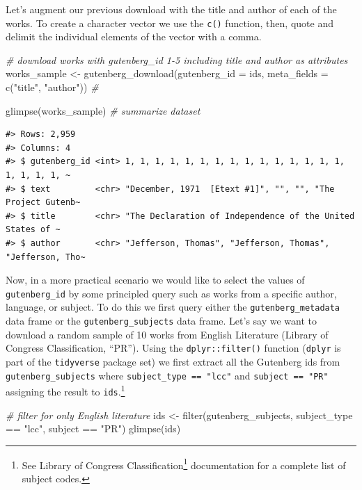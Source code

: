 \documentclass[
  letterpaper,
]{scrbook}
\newenvironment{Shaded}{\begin{snugshade}}{\end{snugshade}}
\newcommand{\AttributeTok}[1]{\textcolor[rgb]{0.00,0.00,0.00}{#1}}
\newcommand{\CommentTok}[1]{\textcolor[rgb]{0.00,0.00,0.00}{\textit{#1}}}
\newcommand{\FunctionTok}[1]{\textcolor[rgb]{0.00,0.00,0.00}{#1}}
\newcommand{\NormalTok}[1]{\textcolor[rgb]{0.00,0.00,0.00}{#1}}
\newcommand{\OtherTok}[1]{\textcolor[rgb]{0.00,0.00,0.00}{#1}}
\newcommand{\SpecialCharTok}[1]{\textcolor[rgb]{0.00,0.00,0.00}{#1}}
\newcommand{\StringTok}[1]{\textcolor[rgb]{0.00,0.00,0.00}{#1}}
\DeclareRobustCommand{\href}[2]{#2\footnote{\url{#1}}}
\begin{document}
Let's augment our previous download with the title and author of each of
the works. To create a character vector we use the \texttt{c()}
function, then, quote and delimit the individual elements of the vector
with a comma.

\begin{Shaded}
\begin{Highlighting}[]
\CommentTok{\# download works with \textasciigrave{}gutenberg\_id\textasciigrave{} 1{-}5 including \textasciigrave{}title\textasciigrave{} and \textasciigrave{}author\textasciigrave{} as attributes}
\NormalTok{works\_sample }\OtherTok{\textless{}{-}} 
  \FunctionTok{gutenberg\_download}\NormalTok{(}\AttributeTok{gutenberg\_id =}\NormalTok{ ids, }\AttributeTok{meta\_fields =} \FunctionTok{c}\NormalTok{(}\StringTok{"title"}\NormalTok{, }\StringTok{"author"}\NormalTok{)) }\CommentTok{\#}

\FunctionTok{glimpse}\NormalTok{(works\_sample) }\CommentTok{\# summarize dataset}
\end{Highlighting}
\end{Shaded}

\begin{verbatim}
#> Rows: 2,959
#> Columns: 4
#> $ gutenberg_id <int> 1, 1, 1, 1, 1, 1, 1, 1, 1, 1, 1, 1, 1, 1, 1, 1, 1, 1, 1, ~
#> $ text         <chr> "December, 1971  [Etext #1]", "", "", "The Project Gutenb~
#> $ title        <chr> "The Declaration of Independence of the United States of ~
#> $ author       <chr> "Jefferson, Thomas", "Jefferson, Thomas", "Jefferson, Tho~
\end{verbatim}

Now, in a more practical scenario we would like to select the values of
\texttt{gutenberg\_id} by some principled query such as works from a
specific author, language, or subject. To do this we first query either
the \texttt{gutenberg\_metadata} data frame or the
\texttt{gutenberg\_subjects} data frame. Let's say we want to download a
random sample of 10 works from English Literature (Library of Congress
Classification, ``PR''). Using the \texttt{dplyr::filter()} function
(\texttt{dplyr} is part of the \texttt{tidyverse} package set) we first
extract all the Gutenberg ids from \texttt{gutenberg\_subjects} where
\texttt{subject\_type\ ==\ "lcc"} and \texttt{subject\ ==\ "PR"}
assigning the result to \texttt{ids}.\footnote{See
  \href{https://www.loc.gov/catdir/cpso/lcco/}{Library of Congress
  Classification} documentation for a complete list of subject codes.}

\begin{Shaded}
\begin{Highlighting}[]
\CommentTok{\# filter for only English literature}
\NormalTok{ids }\OtherTok{\textless{}{-}} 
  \FunctionTok{filter}\NormalTok{(gutenberg\_subjects, subject\_type }\SpecialCharTok{==} \StringTok{"lcc"}\NormalTok{, subject }\SpecialCharTok{==} \StringTok{"PR"}\NormalTok{)}
\FunctionTok{glimpse}\NormalTok{(ids)}
\end{Highlighting}
\end{Shaded}
\end{document}
